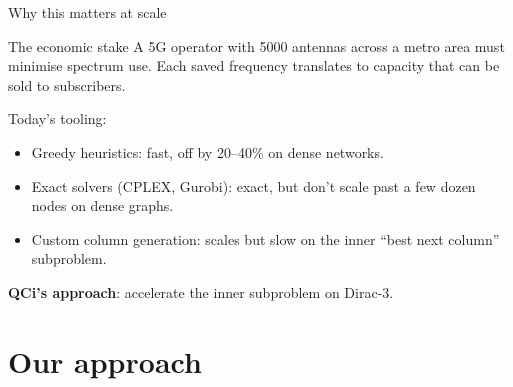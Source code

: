 \documentclass[aspectratio=169,11pt]{beamer}
\begin{document}
\begin{frame}{Why this matters at scale}
  \begin{block}{The economic stake}
    A 5G operator with 5000 antennas across a metro area must minimise
    spectrum use. \alert{Each saved frequency} translates to
    capacity that can be sold to subscribers.
  \end{block}

  \medskip
  Today's tooling:
  \begin{itemize}
    \item Greedy heuristics: fast, off by 20--40\% on dense networks.
    \item Exact solvers (CPLEX, Gurobi): exact, but \alert{don't scale}
          past a few dozen nodes on dense graphs.
    \item Custom column generation: scales but slow on the inner
          ``best next column'' subproblem.
  \end{itemize}

  \medskip
  \textbf{QCi's approach}: accelerate the inner subproblem on Dirac-3.
\end{frame}

\section{Our approach}
\end{document}
